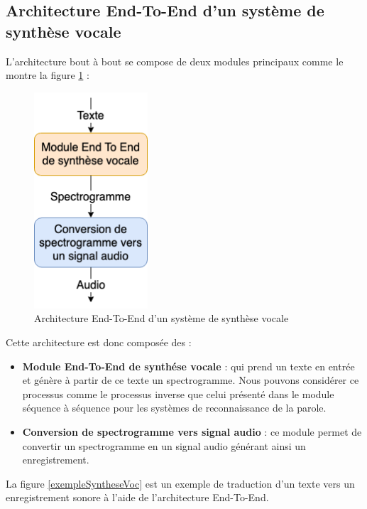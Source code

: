 \subsection{Architecture End-To-End d'un système de synthèse vocale}
L'architecture bout à bout \cite{e2espeechsynth} se compose de deux modules principaux comme le montre la figure \ref{E2Esynthese} : 
\begin{figure}[H]
    \centering
    \includegraphics[width=120pt]{images/chap1/Synthese_E2E_Archi.png}
    \caption{Architecture End-To-End d'un système de synthèse vocale}
    \label{E2Esynthese}
\end{figure}

Cette architecture est donc composée des : 

\begin{itemize}
    \item \textbf{Module End-To-End de synthése vocale} : qui prend un texte en entrée et génère à partir de ce texte un spectrogramme. Nous pouvons considérer ce processus comme le processus inverse que celui présenté dans le module séquence à séquence pour les systèmes de reconnaissance de la parole.
    \item \textbf{Conversion de spectrogramme vers signal audio} : ce module permet de convertir un spectrogramme en un signal audio générant ainsi un enregistrement. \\
\end{itemize}

La figure \ref{exempleSyntheseVoc} est un exemple de traduction d'un texte vers un enregistrement sonore à l'aide de l'architecture End-To-End.

